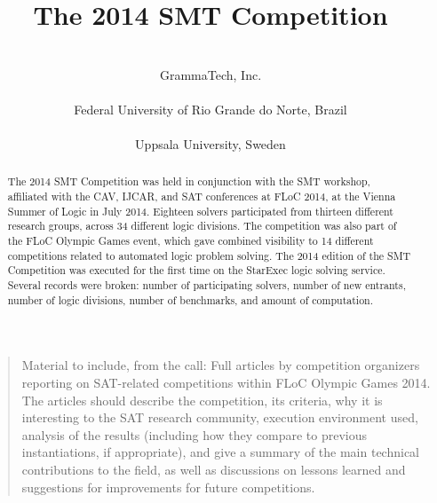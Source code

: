 \documentclass[twoside,11pt]{article}
\newcommand{\comment}[2]{\begin{quote}\sc #1\marginpar{\textcolor{red}{$\ast^{\mbox{#2}}$}}\end{quote}}
\newcommand{\davidc}[1]{\comment{#1}{DC}}
\begin{document}
\title{The 2014 SMT Competition}

\author{
 \\
\addr GrammaTech, Inc. \\
\AND
{}
 \\
\addr Federal University of Rio Grande do Norte, Brazil \\ 
\AND
{} \\
\addr Uppsala University, Sweden
}

\maketitle

\begin{abstract}
The 2014 SMT Competition was held in conjunction with the SMT workshop, affiliated with the CAV, IJCAR, and SAT conferences at FLoC 2014, at the Vienna Summer of Logic in July 2014. Eighteen solvers participated from thirteen different research groups, across 34 different logic divisions. The competition was also part of the FLoC Olympic Games event, which gave combined visibility to 14 different competitions related to automated logic problem solving.
The 2014 edition of the SMT Competition was executed for the first time on the StarExec logic solving service. Several records were broken: number of participating solvers, number of new entrants, number of logic divisions, number of benchmarks, and amount of computation.
\end{abstract}



\davidc{Material to include, from the call: Full articles by competition organizers reporting on SAT-related competitions
  within FLoC Olympic Games 2014. The articles should describe the competition,
  its criteria, why it is interesting to the SAT research community, execution
  environment used, analysis of the results (including how they compare to
  previous instantiations, if appropriate), and give a summary of the main
  technical contributions to the field, as well as discussions on lessons
  learned and suggestions for improvements for future competitions. }
		
\end{document}
